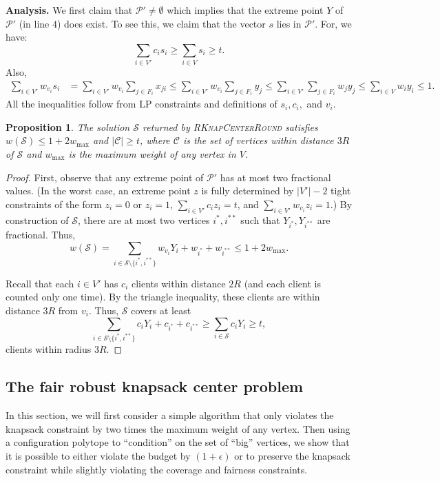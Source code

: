 \documentclass[a4paper,11pt]{article}
\newtheorem{proposition}[theorem]{Proposition}
\newcommand{\C}{\mathcal{C}}
\renewcommand{\S}{\mathcal{S}}
\renewcommand{\P}{\mathcal{P}}
\begin{document}
\bigskip \noindent \textbf{Analysis.} We first claim that $\P' \neq \emptyset$ which implies that the extreme point $Y$ of $\P'$ (in line $4$) does exist. To see this, we claim that the vector $s$ lies in $\P'$. For, we have:
$$
\sum_{i\in V'} c_i s_i \geq \sum_{i\in V} s_i \geq t. $$
Also,
\begin{align*}
	\sum_{i \in V'} w_{v_i} s_i &= \sum_{i \in V'} w_{v_i} \sum_{j \in F_i} x_{ji} \leq \sum_{i \in V'} w_{v_i} \sum_{j \in F_i} y_j \leq \sum_{i \in V'}  \sum_{j \in F_i} w_j y_j  \leq \sum_{i \in V} w_i y_i \leq 1. 
\end{align*}
All the inequalities follow from LP constraints and definitions of $s_i, c_i, $ and $v_i$.

\begin{proposition}
The solution $\S$ returned by \textsc{RKnapCenterRound} satisfies $w(\S) \leq 1 + 2w_{\text{max}}$ and $|\C| \geq t$, where $\C$ is the set of vertices within distance $3R$ of $\S$ and $w_{\text{max}}$ is the maximum weight of any vertex in $V$.
\label{prop:RKnapCenterRound}
\end{proposition}
\begin{proof}
First, observe that any extreme point of $\P'$ has at most two fractional values. (In the worst case, an extreme point $z$ is fully determined by $|V'|-2$ tight constraints of the form $z_i = 0$ or $z_i = 1$, $\sum_{i\in V'}c_i z_i = t$, and $ \sum_{i \in V'} w_{v_i} z_i = 1$.) By construction of $\S$, there are at most two vertices $i^*, i^{**}$ such that $Y_{i^*}, Y_{i^{**}}$ are fractional. Thus, 
$$w(\S) = \sum_{i \in \S \setminus\{i^*, i^{**}\}} w_{v_i}Y_i + w_{i^*} + w_{i^{**}} \leq 1 + 2w_{\text{max}}.$$

Recall that each $i \in V'$ has $c_i$ clients within distance $2 R$ (and each client is counted only one time). By the triangle inequality, these clients are within distance $3R$ from $v_i$. Thus, $\S$  covers at least 
$$ \sum_{i \in \S \setminus\{i^*, i^{**}\}} c_i Y_i + c_{i^*} + c_{i^{**}} \geq \sum_{i \in \S} c_i Y_i \geq t,$$
clients within radius $3R$.
\end{proof}



\subsection{The fair robust knapsack center problem}
In this section, we will first consider a simple algorithm that only violates the knapsack constraint by two times the maximum weight of any vertex. Then using a configuration polytope to ``condition'' on the set of ``big'' vertices, we show that it is possible to either violate the budget by $(1+\epsilon)$ or to preserve the knapsack constraint while slightly violating the coverage and fairness constraints.
\end{document}
